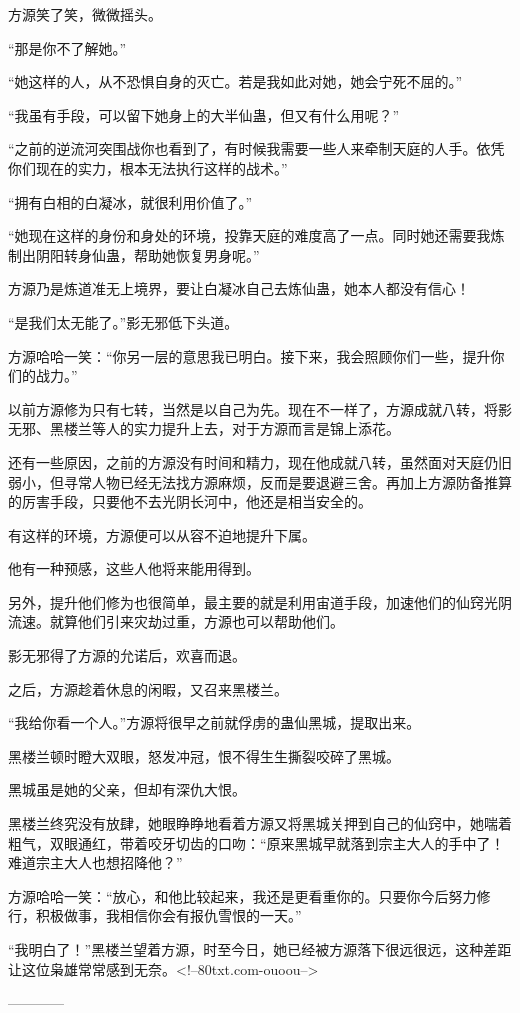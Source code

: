 \begin{this_body}
方源笑了笑，微微摇头。

“那是你不了解她。”

“她这样的人，从不恐惧自身的灭亡。若是我如此对她，她会宁死不屈的。”

“我虽有手段，可以留下她身上的大半仙蛊，但又有什么用呢？”

“之前的逆流河突围战你也看到了，有时候我需要一些人来牵制天庭的人手。依凭你们现在的实力，根本无法执行这样的战术。”

“拥有白相的白凝冰，就很利用价值了。”

“她现在这样的身份和身处的环境，投靠天庭的难度高了一点。同时她还需要我炼制出阴阳转身仙蛊，帮助她恢复男身呢。”

方源乃是炼道准无上境界，要让白凝冰自己去炼仙蛊，她本人都没有信心！

“是我们太无能了。”影无邪低下头道。

方源哈哈一笑：“你另一层的意思我已明白。接下来，我会照顾你们一些，提升你们的战力。”

以前方源修为只有七转，当然是以自己为先。现在不一样了，方源成就八转，将影无邪、黑楼兰等人的实力提升上去，对于方源而言是锦上添花。

还有一些原因，之前的方源没有时间和精力，现在他成就八转，虽然面对天庭仍旧弱小，但寻常人物已经无法找方源麻烦，反而是要退避三舍。再加上方源防备推算的厉害手段，只要他不去光阴长河中，他还是相当安全的。

有这样的环境，方源便可以从容不迫地提升下属。

他有一种预感，这些人他将来能用得到。

另外，提升他们修为也很简单，最主要的就是利用宙道手段，加速他们的仙窍光阴流速。就算他们引来灾劫过重，方源也可以帮助他们。

影无邪得了方源的允诺后，欢喜而退。

之后，方源趁着休息的闲暇，又召来黑楼兰。

“我给你看一个人。”方源将很早之前就俘虏的蛊仙黑城，提取出来。

黑楼兰顿时瞪大双眼，怒发冲冠，恨不得生生撕裂咬碎了黑城。

黑城虽是她的父亲，但却有深仇大恨。

黑楼兰终究没有放肆，她眼睁睁地看着方源又将黑城关押到自己的仙窍中，她喘着粗气，双眼通红，带着咬牙切齿的口吻：“原来黑城早就落到宗主大人的手中了！难道宗主大人也想招降他？”

方源哈哈一笑：“放心，和他比较起来，我还是更看重你的。只要你今后努力修行，积极做事，我相信你会有报仇雪恨的一天。”

“我明白了！”黑楼兰望着方源，时至今日，她已经被方源落下很远很远，这种差距让这位枭雄常常感到无奈。<!--80txt.com-ouoou-->

------------

\end{this_body}

